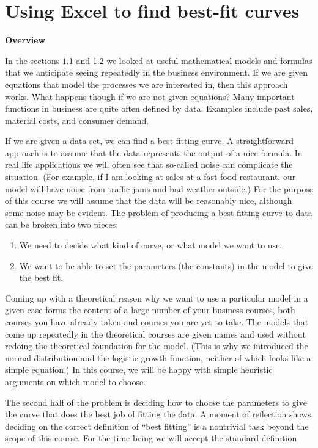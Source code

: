 \documentclass[10pt,]{book}
\newcommand{\terminology}[1]{\textbf{#1}}
\theoremstyle{plain}
\theoremstyle{definition}
\theoremstyle{definition}
\begin{document}
\section[{Using Excel to find best-fit curves}]{Using Excel to find best-fit curves}\label{sec-1-5-IntroBestFitCurves}
\terminology{Overview}%
\par
In the sections 1.1 and 1.2 we looked at useful mathematical models and formulas that we anticipate seeing repeatedly in the business environment.  If we are given equations that model the processes we are interested in, then this approach works. What happens though if we are not given equations? Many important functions in business are quite often defined by data.  Examples include past sales, material costs, and consumer demand. %
\par
If we are given a data set, we can find a best fitting curve.  A straightforward approach is to assume that the data represents the output of a nice formula. In real life applications we will often see that so-called noise can complicate the situation.  (For example, if I am looking at sales at a fast food restaurant, our model will have noise from traffic jams and bad weather outside.) For the purpose of this course we will assume that the data will be reasonably nice, although some noise may be evident. The problem of producing a best fitting curve to data can be broken into two pieces: %
\leavevmode%
\begin{enumerate}
\item\hypertarget{li-68}{}We need to decide what kind of curve, or what model we want to use. %
\item\hypertarget{li-69}{}We want to be able to set the parameters (the constants) in the model to give the best fit.%
\end{enumerate}
\par
Coming up with a theoretical reason why we want to use a particular model in a given case forms the content of a large number of your business courses, both courses you have already taken and courses you are yet to take.  The models that come up repeatedly in the theoretical courses are given names and used without redoing the theoretical foundation for the model.  (This is why we introduced the normal distribution and the logistic growth function, neither of which looks like a simple equation.)  In this course, we will be happy with simple heuristic arguments on which model to choose.
%
\par
The second half of the problem is deciding how to choose the parameters to give the curve that does the best job of fitting the data.  A moment of reflection shows deciding on the correct definition of “best fitting” is a nontrivial task beyond the scope of this course.  For the time being we will accept the standard definition 
\end{document}
